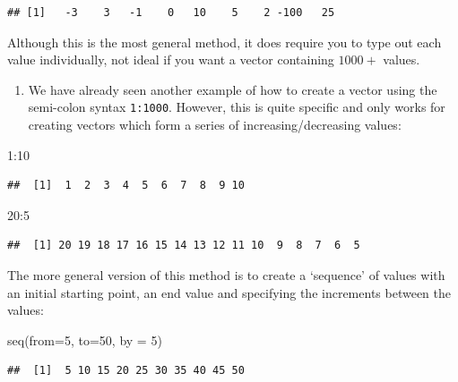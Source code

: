 \documentclass[
]{book}
\newenvironment{Shaded}{\begin{snugshade}}{\end{snugshade}}
\newcommand{\AttributeTok}[1]{\textcolor[rgb]{0.77,0.63,0.00}{#1}}
\newcommand{\DecValTok}[1]{\textcolor[rgb]{0.00,0.00,0.81}{#1}}
\newcommand{\FunctionTok}[1]{\textcolor[rgb]{0.00,0.00,0.00}{#1}}
\newcommand{\NormalTok}[1]{#1}
\newcommand{\SpecialCharTok}[1]{\textcolor[rgb]{0.00,0.00,0.00}{#1}}
\providecommand{\tightlist}{%
  \setlength{\itemsep}{0pt}\setlength{\parskip}{0pt}}
\theoremstyle{definition}
\theoremstyle{definition}
\theoremstyle{definition}
\theoremstyle{definition}
\theoremstyle{remark}
\begin{document}
\begin{verbatim}
## [1]   -3    3   -1    0   10    5    2 -100   25
\end{verbatim}

Although this is the most general method, it does require you to type out each value individually, not ideal if you want a vector containing \(1000+\) values.

\begin{enumerate}
\def\labelenumi{\arabic{enumi}.}
\setcounter{enumi}{1}
\tightlist
\item
  We have already seen another example of how to create a vector using the semi-colon syntax \texttt{1:1000}. However, this is quite specific and only works for creating vectors which form a series of increasing/decreasing values:
\end{enumerate}

\begin{Shaded}
\begin{Highlighting}[]
\DecValTok{1}\SpecialCharTok{:}\DecValTok{10}
\end{Highlighting}
\end{Shaded}

\begin{verbatim}
##  [1]  1  2  3  4  5  6  7  8  9 10
\end{verbatim}

\begin{Shaded}
\begin{Highlighting}[]
\DecValTok{20}\SpecialCharTok{:}\DecValTok{5}
\end{Highlighting}
\end{Shaded}

\begin{verbatim}
##  [1] 20 19 18 17 16 15 14 13 12 11 10  9  8  7  6  5
\end{verbatim}

The more general version of this method is to create a `sequence' of values with an initial starting point, an end value and specifying the increments between the values:

\begin{Shaded}
\begin{Highlighting}[]
\FunctionTok{seq}\NormalTok{(}\AttributeTok{from=}\DecValTok{5}\NormalTok{, }\AttributeTok{to=}\DecValTok{50}\NormalTok{, }\AttributeTok{by =} \DecValTok{5}\NormalTok{)}
\end{Highlighting}
\end{Shaded}

\begin{verbatim}
##  [1]  5 10 15 20 25 30 35 40 45 50
\end{verbatim}
\end{document}
